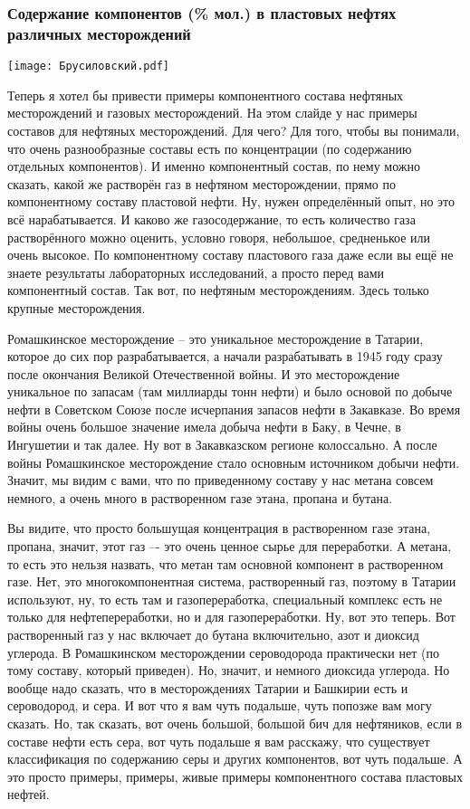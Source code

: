 \documentclass[main.tex]{subfiles}
\begin{document}
\subsubsection{Содержание компонентов (\% мол.) в пластовых нефтях различных месторождений}

\begin{center}
\texttt{[image: Брусиловский.pdf]}
\end{center}

Теперь я хотел бы привести примеры компонентного состава нефтяных месторождений и газовых месторождений.
На этом слайде у нас примеры составов для нефтяных месторождений.
Для чего?
Для того, чтобы вы понимали, что очень разнообразные составы есть по концентрации (по содержанию отдельных компонентов).
И именно компонентный состав, по нему можно сказать, какой же растворён газ в нефтяном месторождении, прямо по компонентному составу пластовой нефти.
Ну, нужен определённый опыт, но это всё нарабатывается.
И каково же газосодержание, то есть количество газа растворённого можно оценить, условно говоря, небольшое, средненькое или очень высокое.
По компонентному составу пластового газа даже если вы ещё не знаете результаты лабораторных исследований, а просто перед вами компонентный состав.
Так вот, по нефтяным месторождениям.
Здесь только крупные месторождения.

Ромашкинское месторождение -- это уникальное месторождение в Татарии, которое до сих пор разрабатывается, а начали разрабатывать в 1945 году сразу после окончания Великой Отечественной войны.
И это месторождение уникальное по запасам (там миллиарды тонн нефти) и было основой по добыче нефти в Советском Союзе после исчерпания запасов нефти в Закавказе.
Во время войны очень большое значение имела добыча нефти в Баку, в Чечне, в Ингушетии и так далее.
Ну вот в Закавказском регионе колоссально.
А после войны Ромашкинское месторождение стало основным источником добычи нефти.
Значит, мы видим с вами, что по приведенному составу у нас метана совсем немного, а очень много в растворенном газе этана, пропана и бутана.

Вы видите, что просто большущая концентрация в растворенном газе этана, пропана, значит, этот газ –- это очень ценное сырье для переработки.
А метана, то есть это нельзя назвать, что метан там основной компонент в растворенном газе.
Нет, это многокомпонентная система, растворенный газ, поэтому в Татарии используют, ну, то есть там и газопереработка, специальный комплекс есть не только для нефтепереработки, но и для газопереработки.
Ну, вот это теперь.
Вот растворенный газ у нас включает до бутана включительно, азот и диоксид углерода.
В Ромашкинском месторождении сероводорода практически нет (по тому составу, который приведен).
Но, значит, и немного диоксида углерода.
Но вообще надо сказать, что в месторождениях Татарии и Башкирии есть и сероводород, и сера.
И вот что я вам чуть подальше, чуть попозже вам могу сказать.
Но, так сказать, вот очень большой, большой бич для нефтяников, если в составе нефти есть сера, вот чуть подальше я вам расскажу, что существует классификация по содержанию серы и других компонентов, вот чуть подальше.
А это просто примеры, примеры, живые примеры компонентного состава пластовых нефтей.
\end{document}
